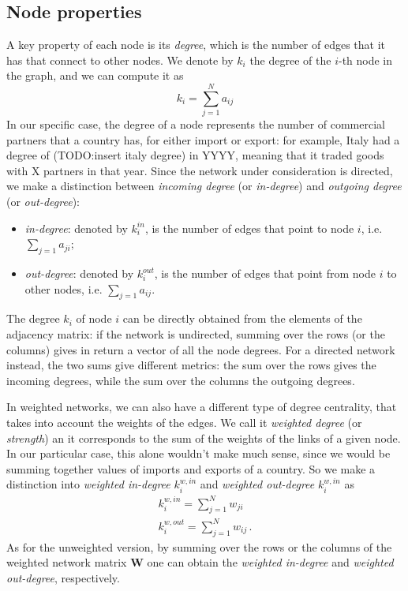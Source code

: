 \subsection{Node properties}
A key property of each node is its \textit{degree}, which is the number of edges that it has that connect to other nodes. We denote by $k_i$ the degree of the $i$-th node in the graph, and we can compute it as 
\[
    k_i = \sum_{j=1}^N a_{ij}
\] 
In our specific case, the degree of a node represents the number of commercial partners that a country has, for either import or export: for example, Italy had a degree of (TODO:insert italy degree) in YYYY, meaning that it traded goods with X partners in that year.
Since the network under consideration is directed, we make a distinction between \textit{incoming degree} (or \textit{in-degree}) and \textit{outgoing degree} (or \textit{out-degree}):
\begin{itemize}
    \item \textit{in-degree}: denoted by $k_i^{in}$, is the number of edges that point to node $i$, i.e. $\sum_{j=1} a_{ji}$;
    \item \textit{out-degree}: denoted by $k_i^{out}$, is the number of edges that point from node $i$ to other nodes, i.e. $\sum_{j=1} a_{ij}$.
\end{itemize}
The degree $k_i$ of node $i$ can be directly obtained from the elements of the adjacency matrix: if the network is undirected, summing over the rows (or the columns) gives in return a vector of all the node degrees. For a directed network instead, the two sums give different metrics: the sum over the rows gives the incoming degrees, while the sum over the columns the outgoing degrees.

In weighted networks, we can also have a different type of degree centrality, that takes into account the weights of the edges. We call it \textit{weighted degree} (or \textit{strength}) an it corresponds to the sum of the weights of the links of a given node. In our particular case, this alone wouldn't make much sense, since we would be summing together values of imports and exports of a country. So we make a distinction into \textit{weighted in-degree} $k_i^{w,in}$ and \textit{weighted out-degree} $k_i^{w,in}$ as
\begin{align*}
    k_i^{w,in} = \sum_{j=1}^N w_{ji} \\    
    k_i^{w,out} = \sum_{j=1}^N w_{ij} \,.    
\end{align*}
As for the unweighted version, by summing over the rows or the columns of the weighted network matrix $\mathbf{W}$ one can obtain the \textit{weighted in-degree} and \textit{weighted out-degree}, respectively.

